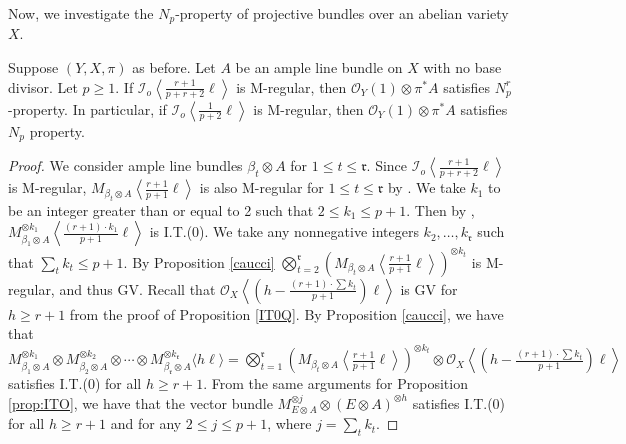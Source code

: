 \documentclass[11pt,letter]{amsart}
\numberwithin{equation}{section}
\begin{document}
Now, we investigate the $N_p$-property of projective bundles over an abelian variety $X$. 

\begin{thm}\label{thm:5.4}
Suppose $(Y,X,\pi)$ as before. 
Let $A$ be an ample line bundle on $X$ with no base divisor. Let $p\geq 1$.
 If $\mathcal{I}_o\left\langle \frac{r+1}{p+r+2}\ell\right\rangle$ is M-regular, then $\mathcal{O}_Y(1)\otimes\pi^*A$ satisfies $N_p^r$-property.  
 In particular, if $\mathcal{I}_o\left\langle \frac{1}{p+2}\ell\right\rangle$ is M-regular, then $\mathcal{O}_Y(1)\otimes\pi^*A$ satisfies $N_p$ property. 
\end{thm}
\begin{proof}
 We consider ample line bundles $\beta_t\otimes A$ for $1\leq t\leq \mathfrak{r}$. Since $\mathcal{I}_o\left\langle\frac{r+1}{p+r+2}\ell\right\rangle$ is M-regular, $M_{\beta_t\otimes A}\left\langle\frac{r+1}{p+1}\ell\right\rangle$ is also M-regular for $1\leq t\leq\mathfrak{r}$ by \cite[Proposition 4.1]{Ito22}. 
 We take $k_1$ to be an integer greater than or equal to 2 such that $2\leq k_1\leq p+1$. Then by \cite[Proposition 6.2]{Ito22}, $M_{\beta_1\otimes A}^{\otimes k_1}\left\langle\frac{(r+1)\cdot k_1}{p+1}\ell\right\rangle$ is I.T.(0). We take any nonnegative integers $k_2,\ldots,k_{\mathfrak{r}}$ such that $\sum_tk_t\leq p+1$. By Proposition \ref{caucci}
 $\bigotimes_{t=2}^\mathfrak{r} \left(M_{\beta_t\otimes A}\left\langle\frac{r+1}{p+1}\ell\right\rangle\right)^{\otimes k_t}$ is M-regular, and thus GV. Recall that $\mathcal{O}_X\left\langle \left(h-\frac{(r+1)\cdot\sum k_t}{p+1}\right)\ell\right\rangle$ is GV for $h\geq r+1$ from the proof of Proposition \ref{IT0Q}. By Proposition \ref{caucci}, we have that    
$M_{\beta_1\otimes A}^{\otimes k_1}\otimes M_{\beta_2\otimes A}^{\otimes k_2}\otimes\cdots\otimes M_{\beta_{\mathfrak{r}}\otimes A}^{\otimes k_\mathfrak{r}}\langle h\ell\rangle=\bigotimes_{t=1}^\mathfrak{r} \left(M_{\beta_t\otimes A}\left\langle\frac{r+1}{p+1}\ell\right\rangle\right)^{\otimes k_t}\otimes \mathcal{O}_X\left\langle \left(h-\frac{(r+1)\cdot\sum k_t}{p+1}\right)\ell\right\rangle$ satisfies I.T.(0) for all $h\geq r+1$. From the same arguments for Proposition \ref{prop:ITO}, we have that the vector bundle $M_{E\otimes A}^{\otimes j}\otimes (E\otimes A)^{\otimes h}$ satisfies I.T.(0) for all $h\geq r+1$ and for any $2\leq j\leq p+1$, where $j=\sum_tk_t$.
 


\end{proof}
\end{document}
